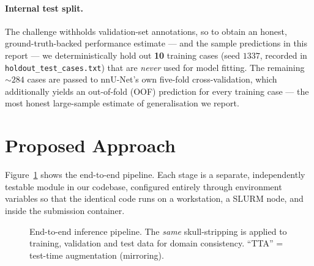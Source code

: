 \documentclass[11pt,a4paper]{article}
\begin{document}
\paragraph{Internal test split.}
The challenge withholds validation-set annotations, so to obtain an honest,
ground-truth-backed performance estimate --- and the sample predictions in this
report --- we deterministically hold out \textbf{10} training cases (seed $1337$,
recorded in \texttt{holdout\_test\_cases.txt}) that are \emph{never} used for model
fitting. The remaining $\sim\!284$ cases are passed to nnU-Net's own five-fold
cross-validation, which additionally yields an out-of-fold (OOF) prediction for every
training case --- the most honest large-sample estimate of generalisation we report.

\section{Proposed Approach}
\label{sec:approach}
Figure~\ref{fig:pipeline} shows the end-to-end pipeline. Each stage is a separate,
independently testable module in our codebase, configured entirely through
environment variables so that the identical code runs on a workstation, a SLURM node,
and inside the submission container.

\begin{figure}[h]
\centering
{}
\caption{End-to-end inference pipeline. The \emph{same} skull-stripping is applied to
training, validation and test data for domain consistency. ``TTA'' = test-time
augmentation (mirroring).}
\label{fig:pipeline}
\end{figure}
\end{document}
